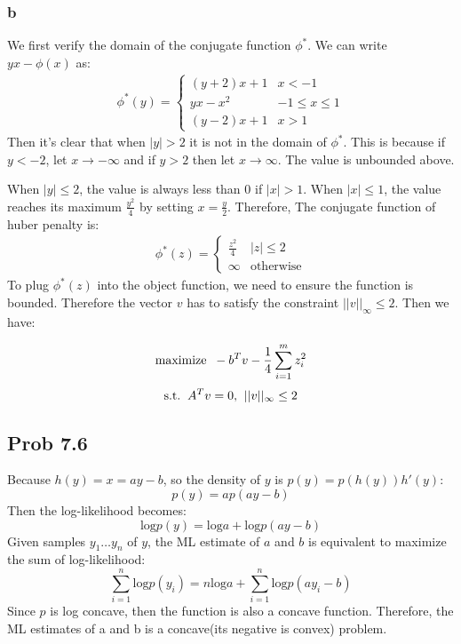 \documentclass[10pt,a4paper]{article}
\begin{document}
\subsubsection{b}
We first verify the domain of the conjugate function $\phi^*$. We can
write $yx-\phi(x)$ as:
\begin{align*}
  \phi^*(y)=
  \begin{cases}
    (y+2)x+1 & x<-1\\
    yx-x^2 & -1\leq x\leq 1\\
    (y-2)x+1 & x>1
  \end{cases}
\end{align*}
Then it's clear that when $|y|>2$ it is not in the domain of
$\phi^*$. This is because if $y<-2$, let $x\rightarrow
-\infty$ and if $y>2$ then let $x \rightarrow \infty$. The
value is unbounded above.

When $|y|\leq 2$, the value is always less than $0$ if
$|x|>1$. When $|x|\leq 1$, the value reaches its maximum
$\frac{y^2}{4}$ by setting $x=\frac{y}{2}$.
Therefore, The conjugate function of huber penalty
is:
\begin{align*}
  \phi^*(z) = 
  \begin{cases}
    \frac{z^2}{4} & |z|\leq 2\\
    \infty & \text{otherwise}
  \end{cases}
\end{align*}
To plug $\phi^*(z)$ into the object function, we need to
ensure the function is bounded. Therefore the vector $v$
has to satisfy the constraint $||v||_{\infty}\leq 2$. Then
we have:

$$\text{maximize\;\;} -b^Tv-\frac{1}{4}\sum_{i=1}^{m}z_i^2$$
$$\text{s.t.\;\;} A^Tv=0\text{,\;\;} ||v||_{\infty}\leq 2$$

\subsection{Prob 7.6}

Because $h(y)=x=ay-b$, so the density of $y$ is
$p(y)=p(h(y))h'(y)$:
$$p(y)= ap(ay-b)$$ 
Then the log-likelihood becomes:
$$ \text{log}p(y) = \text{log}a + \text{log}p(ay-b)$$
Given samples $y_1\dots y_n$ of $y$, the ML estimate of $a$
and $b$ is equivalent to maximize the sum of log-likelihood:
$$\sum_{i=1}^{n}\text{log}p(y_i)=n\text{log}a+\sum_{i=1}^{n}\text{log}p(ay_i-b)$$
Since $p$ is log concave, then the function is also a
concave function. Therefore, the ML estimates of a and b is
a concave(its negative is convex) problem.
\end{document}
